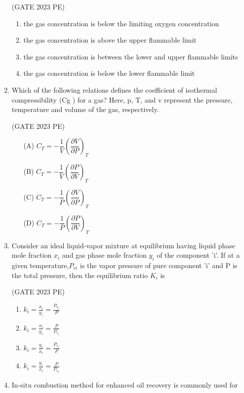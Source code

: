 \documentclass[journal,12pt,onecolumn]{exam}
\theoremstyle{remark}
\begin{document}
\begin{enumerate}
\hfill{(GATE 2023 PE)}\\
\begin{enumerate}
    \item the gas concentration is below the limiting oxygen concentration
    \item the gas concentration is above the upper flammable limit
    \item the gas concentration is between the lower and upper flammable limits
    \item the gas concentration is below the lower flammable limit
\end{enumerate}
\item Which of the following relations defines the coefficient of isothermal
compressibility (Cg ) for a gas?
Here, p, T, and v represent the pressure, temperature and volume of the gas,
respectively.

\hfill{(GATE 2023 PE)}\\
\begin{enumerate}
 \item[(A)] $C_T = -\dfrac{1}{V}\left(\dfrac{\partial V}{\partial P}\right)_T$
    \item[(B)] $C_T = -\dfrac{1}{V}\left(\dfrac{\partial P}{\partial V}\right)_T$
    \item[(C)] $C_T = -\dfrac{1}{P}\left(\dfrac{\partial V}{\partial P}\right)_T$
    \item[(D)] $C_T = -\dfrac{1}{P}\left(\dfrac{\partial P}{\partial V}\right)_T$
\end{enumerate}
\item Consider an ideal liquid-vapor mixture at equilibrium having liquid phase mole fraction ${x_i}$ and gas phase mole fraction ${y_i}$ of the component 'i'. If at a given temperature,${P_{vi}}$ is the vapor pressure of pure component 'i' and P is the total
pressure, then the equilibrium ratio ${K_i}$ is

\hfill{(GATE 2023 PE)}\\
    \begin{enumerate}
    \item $k_i = \frac{x_i}{y_i} = \frac{P_{v_i}}{P}$
    \item $k_i = \frac{x_i}{y_i} = \frac{P}{P_{v_i}}$
    \item $k_i = \frac{y_i}{x_i} = \frac{P_{v_i}}{P}$
    \item $k_i = \frac{y_i}{x_i} = \frac{P}{P_{v_i}}$
\end{enumerate}
\item In-situ combustion method for enhanced oil recovery is commonly used for


\end{enumerate}
\end{document}
